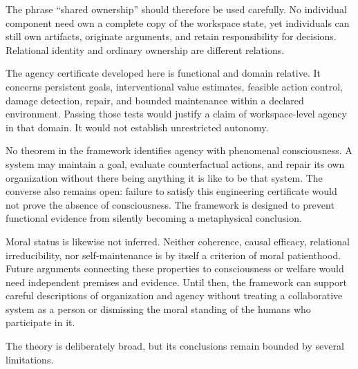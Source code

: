 The phrase ``shared ownership'' should therefore be used carefully. No individual component need own a
complete copy of the workspace state, yet individuals can still own artifacts, originate arguments, and
retain responsibility for decisions. Relational identity and ordinary ownership are different relations.


The agency certificate developed here is functional and domain relative. It concerns persistent goals,
interventional value estimates, feasible action control, damage detection, repair, and bounded maintenance
within a declared environment. Passing those tests would justify a claim of workspace-level agency in that
domain. It would not establish unrestricted autonomy.

No theorem in the framework identifies agency with phenomenal consciousness. A system may maintain a
goal, evaluate counterfactual actions, and repair its own organization without there being anything it is
like to be that system. The converse also remains open: failure to satisfy this engineering certificate
would not prove the absence of consciousness. The framework is designed to prevent functional evidence
from silently becoming a metaphysical conclusion.

Moral status is likewise not inferred. Neither coherence, causal efficacy, relational irreducibility, nor
self-maintenance is by itself a criterion of moral patienthood. Future arguments connecting these properties
to consciousness or welfare would need independent premises and evidence. Until then, the framework can
support careful descriptions of organization and agency without treating a collaborative system as a
person or dismissing the moral standing of the humans who participate in it.


The theory is deliberately broad, but its conclusions remain bounded by several limitations.

